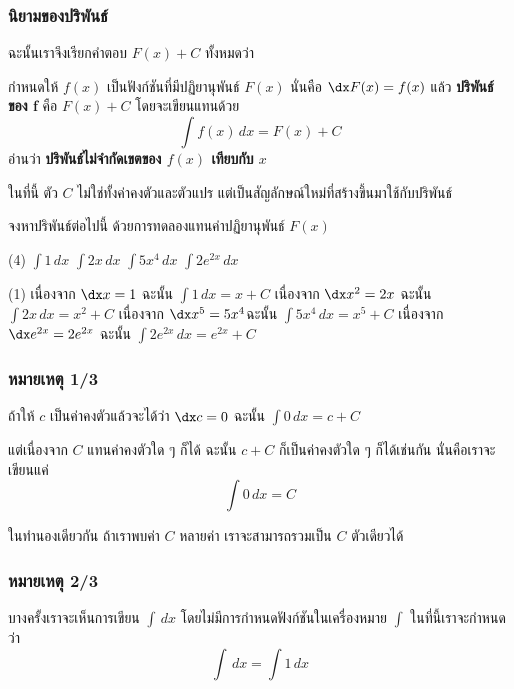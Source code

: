\begin{frame}
\frametitle{นิยามของปริพันธ์}
ฉะนั้นเราจึงเรียกคำตอบ $F(x) + C$ ทั้งหมดว่า  \pa
\begin{defn}{}{}
กำหนดให้ $f(x)$ เป็นฟังก์ชันที่มีปฏิยานุพันธ์ $F(x)$ นั่นคือ $\dx F(x) = f(x)$ \pa แล้ว \textbf{ปริพันธ์ของ f} คือ $F(x) +C$ \pa โดยจะเขียนแทนด้วย
\[ \int f(x) \, dx = F(x) + C\] \pa
อ่านว่า \textbf{ปริพันธ์ไม่จำกัดเขตของ $f(x)$ เทียบกับ $x$}
\end{defn}
ในที่นี้ ตัว $C$ ไม่ใช่ทั้งค่าคงตัวและตัวแปร แต่เป็นสัญลักษณ์ใหม่ที่สร้างขึ้นมาใช้กับปริพันธ์
\end{frame}


\begin{frame}[t]
\begin{ex}
จงหาปริพันธ์ต่อไปนี้ ด้วยการทดลองแทนค่าปฏิยานุพันธ์ $F(x)$ 
\begin{tasks}(4)
\task $ \int 1 \, dx $ 
\task $\int 2x \, dx$ 
\task $\int 5x^4 \, dx$ 
\task $\int 2e^{2x} \, dx$
\end{tasks}
\end{ex}
\begin{sol}
\begin{tasks}(1)
\task เนื่องจาก $\dx x = 1$ \pa ฉะนั้น $ \int 1 \, dx = x + C$ \pa
\task เนื่องจาก $\dx x^2 = 2x$ \pa ฉะนั้น $ \int 2x \, dx = x^2 + C$  \pa
\task เนื่องจาก $\dx x^5 = 5x^4$\pa ฉะนั้น $ \int 5x^4 \, dx = x^5 + C$ \pa 
\task เนื่องจาก $\dx e^{2x} = 2e^{2x}$ \pa ฉะนั้น $ \int 2e^{2x} \, dx = e^{2x} + C$ 
\end{tasks}
\end{sol} \pa
\end{frame}

\begin{frame}
\frametitle{หมายเหตุ 1/3}
\begin{remark}{}
ถ้าให้ $c$ เป็นค่าคงตัวแล้วจะได้ว่า $\dx c = 0$ \pa ฉะนั้น $ \int 0 \, dx = c + C$ \pa

แต่เนื่องจาก $C$ แทนค่าคงตัวใด ๆ ก็ได้ \pa ฉะนั้น $c + C$ ก็เป็นค่าคงตัวใด ๆ ก็ได้เช่นกัน \pa นั่นคือเราจะเขียนแค่ 
\[ \int 0 \, dx = C\] 

ในทำนองเดียวกัน ถ้าเราพบค่า $C$ หลายค่า เราจะสามารถรวมเป็น $C$ ตัวเดียวได้
\end{remark}
\end{frame}

\begin{frame}
\frametitle{หมายเหตุ 2/3}
\begin{remark}{}
บางครั้งเราจะเห็นการเขียน $\int \, dx$ โดยไม่มีการกำหนดฟังก์ชันในเครื่องหมาย $ \int$ \pa ในที่นี้เราจะกำหนดว่า
\[ \int \, dx = \int 1 \, dx\] \pa
\end{remark}
\end{frame}

